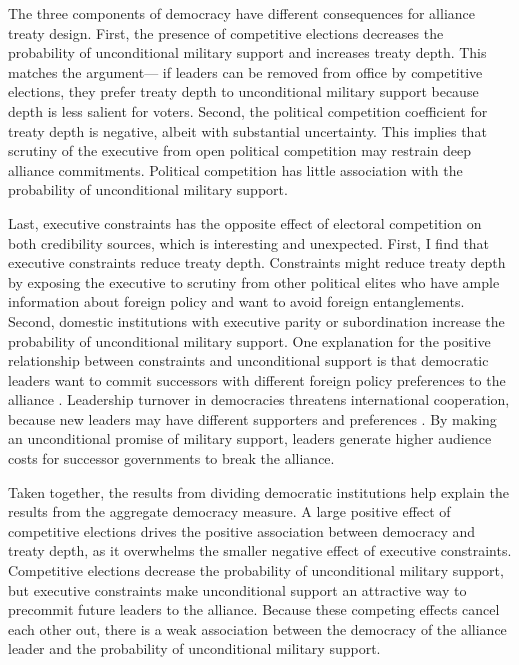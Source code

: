 \documentclass[12pt]{article}
\begin{document}
The three components of democracy have different consequences for alliance treaty design.
First, the presence of competitive elections decreases the probability of unconditional military support and increases treaty depth.
This matches the argument--- if leaders can be removed from office by competitive elections, they prefer treaty depth to unconditional military support because depth is less salient for voters. 
Second, the political competition coefficient for treaty depth is negative, albeit with substantial uncertainty. 
This implies that scrutiny of the executive from open political competition may restrain deep alliance commitments. 
Political competition has little association with the probability of unconditional military support. 


Last, executive constraints has the opposite effect of electoral competition on both credibility sources, which is interesting and unexpected.
First, I find that executive constraints reduce treaty depth.  
Constraints might reduce treaty depth by exposing the executive to scrutiny from other political elites who have ample information about foreign policy and want to avoid foreign entanglements.  
Second, domestic institutions with executive parity or subordination increase the probability of unconditional military support.  
One explanation for the positive relationship between constraints and unconditional support is that democratic leaders want to commit successors with different foreign policy preferences to the alliance \cite{Mattes2012a}. 
Leadership turnover in democracies threatens international cooperation, because new leaders may have different supporters and preferences \citep{Lobell2004, Narizny2007, Leedsetal2009}. 
By making an unconditional promise of military support, leaders generate higher audience costs for successor governments to break the alliance. 


Taken together, the results from dividing democratic institutions help explain the results from the aggregate democracy measure. 
A large positive effect of competitive elections drives the positive association between democracy and treaty depth, as it overwhelms the smaller negative effect of executive constraints. 
Competitive elections decrease the probability of unconditional military support, but executive constraints make unconditional support an attractive way to precommit future leaders to the alliance. 
Because these competing effects cancel each other out, there is a weak association between the democracy of the alliance leader and the probability of unconditional military support. 
\end{document}
